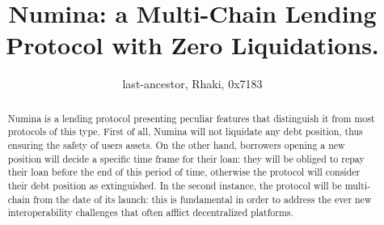 \documentclass[12pt]{paper}
\title{Numina: a Multi-Chain Lending Protocol with Zero Liquidations.}
\author{last-ancestor, Rhaki, 0x7183}
\date{}
\begin{document}
\maketitle


\begin{abstract}
	Numina is a lending protocol presenting peculiar features that distinguish it from most protocols of this type. First of all, Numina will not liquidate any debt position, thus ensuring the safety of users assets. On the other hand, borrowers opening a new position will decide a specific time frame for their loan: they will be obliged to repay their loan before the end of this period of time, otherwise the protocol will consider their debt position as extinguished. In the second instance, the protocol will be multi-chain from the date of its launch: this is fundamental in order to address the ever new interoperability challenges that often afflict decentralized platforms.
\end{abstract}
	
\end{document}
